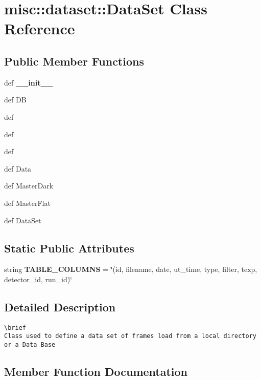 \section{misc::dataset::Data\-Set Class Reference}
\label{classmisc_1_1dataset_1_1DataSet}
\subsection*{Public Member Functions}
\begin{CompactItemize}
\item 
def {\bf\_\-\_\-init\_\-\_\-}
\item 
def {\bfcreate\-DB}
\item 
def {\bfload}
\item 
def {\bfinsert}
\item 
def {\bfdelete}
\item 
def {\bfGet\-Data}
\item 
def {\bfGet\-Master\-Dark}
\item 
def {\bfGet\-Master\-Flat}
\item 
def {\bfList\-Data\-Set}
\end{CompactItemize}
\subsection*{Static Public Attributes}
\begin{CompactItemize}
\item 
string \textbf{TABLE\_\-COLUMNS} = \char`\"{}(id, filename, date, ut\_\-time, type, filter, texp, detector\_\-id, run\_\-id)\char`\"{}\label{classmisc_1_1dataset_1_1DataSet_3a0250bacb8e1e5bfd6761bcbe23e3cd}

\end{CompactItemize}


\subsection{Detailed Description}


\footnotesize\begin{verbatim}
\brief
Class used to define a data set of frames load from a local directory or a Data Base  
\end{verbatim}
\normalsize
 



\subsection{Member Function Documentation}
